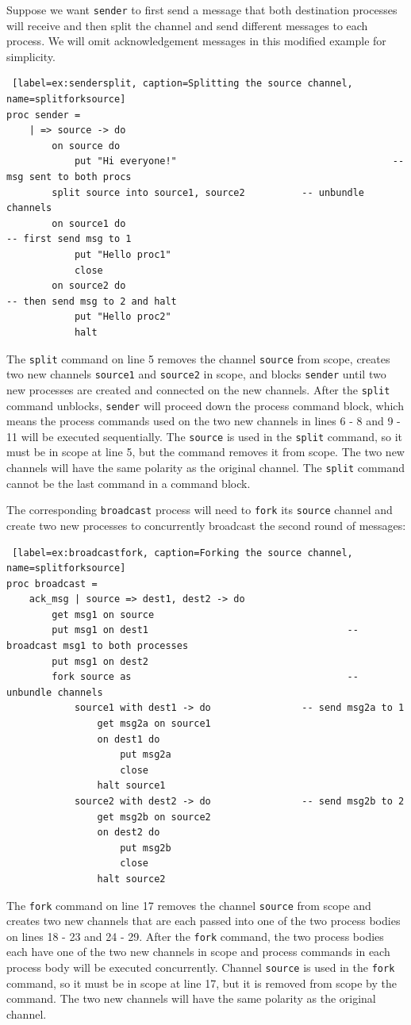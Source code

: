 \documentclass[11pt]{article}
\begin{document}
Suppose we want \lstinline$sender$ to first send a message that both destination processes will receive and then split the channel and send different messages to each process.
We will omit acknowledgement messages in this modified example for simplicity.
\begin{lstlisting} [label=ex:sendersplit, caption=Splitting the source channel, name=splitforksource] 
proc sender =
	| => source -> do
		on source do
			put "Hi everyone!"										-- msg sent to both procs
		split source into source1, source2			-- unbundle channels
		on source1 do														-- first send msg to 1
			put "Hello proc1"
			close
		on source2 do														-- then send msg to 2 and halt
			put "Hello proc2"
			halt
\end{lstlisting} 
The \lstinline$split$ command on line 5 removes the channel \lstinline$source$ from scope, creates two new channels \lstinline$source1$ and \lstinline$source2$ in scope, and blocks \lstinline$sender$ until two new processes are created and connected on the new channels.
After the \lstinline$split$ command unblocks, \lstinline$sender$ will proceed down the process command block, which means the process commands used on the two new channels in lines 6 - 8 and 9 - 11 will be executed sequentially.
The \lstinline$source$ is used in the \lstinline$split$ command, so it must be in scope at line 5, but the command removes it from scope.
The two new channels will have the same polarity as the original channel.
The \lstinline$split$ command cannot be the last command in a command block. 

The corresponding \lstinline$broadcast$ process will need to \lstinline$fork$ its \lstinline$source$ channel and create two new processes to concurrently broadcast the second round of messages:
\begin{lstlisting} [label=ex:broadcastfork, caption=Forking the source channel, name=splitforksource] 
proc broadcast = 
	ack_msg | source => dest1, dest2 -> do
		get msg1 on source				
		put msg1 on dest1									-- broadcast msg1 to both processes
		put msg1 on dest2
		fork source as										-- unbundle channels
			source1 with dest1 -> do				-- send msg2a to 1
				get msg2a on source1
				on dest1 do
					put msg2a
					close
				halt source1
			source2 with dest2 -> do				-- send msg2b to 2
				get msg2b on source2
				on dest2 do
					put msg2b
					close
				halt source2
\end{lstlisting} 
The \lstinline$fork$ command on line 17 removes the channel \lstinline$source$ from scope and creates two new channels that are each passed into one of the two process bodies on lines 18 - 23 and 24 - 29.
After the \lstinline$fork$ command, the two process bodies each have one of the two new channels in scope and process commands in each process body will be executed concurrently.
Channel \lstinline$source$ is used in the \lstinline$fork$ command, so it must be in scope at line 17, but it is removed from scope by the command.
The two new channels will have the same polarity as the original channel.
\end{document}
